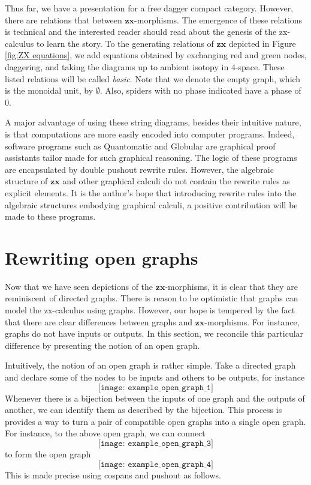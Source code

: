 \documentclass[11pt]{amsart}
\newcommand{\cat}[1]{\mathbf{#1}}
\theoremstyle{remark}
\theoremstyle{definition}
\begin{document}
Thus far, we have a presentation for a free dagger compact category. However, there are relations that between $\cat{zx}$-morphisms.  The emergence of these relations is technical and the interested reader should read about the genesis of the zx-calculus \cite{CoeckeDuncan_QuantumObsFullPaper} to learn the story. To the generating relations of $\cat{zx}$ depicted in Figure \ref{fig:ZX equations}, we add equations obtained by exchanging red and green nodes, daggering, and taking the diagrams up to ambient isotopy in $4$-space. These listed relations will be called \emph{basic}. Note that we denote the empty graph, which is the monoidal unit, by $\emptyset$. Also, spiders with no phase indicated have a phase of $0$. 

A major advantage of using these string diagrams, besides their intuitive nature, is that computations are more easily encoded into computer programs.  Indeed, software programs such as Quantomatic \cite{BarKissingerVicary_Globular,DixonDuncanKissinger_QuantomaticWebsite} and Globular \cite{BarKissingerVicary_Globular} are graphical proof assistants tailor made for such graphical reasoning.  The logic of these programs are encapsulated by double pushout rewrite rules.  However, the algebraic structure of $\cat{zx}$ and other graphical calculi do not contain the rewrite rules as explicit elements.  It is the author's hope that introducing rewrite rules into the algebraic structures embodying graphical calculi, a positive contribution will be made to these programs.  

\section{Rewriting open graphs}
\label{sec:RewritingOpenGraphs}

Now that we have seen depictions of the $\cat{zx}$-morphisms, it is clear that they are reminiscent of directed graphs.  There is reason to be optimistic that graphs can model the zx-calculus using graphs.  However, our hope is tempered by the fact that there are clear differences between graphs and $\cat{zx}$-morphisms.  For instance, graphs do not have inputs or outputs. In this section, we reconcile this particular difference by presenting the notion of an open graph.

Intuitively, the notion of an open graph is rather simple.  Take a directed graph and declare some of the nodes to be inputs and others to be outputs, for instance
\[
\texttt{[image: example\_open\_graph\_1]}
\]
Whenever there is a bijection between the inputs of one graph and the outputs of another, we can identify them as described by the bijection.  This process is provides a way to turn a pair of compatible open graphs into a single open graph.  For instance, to the above open graph, we can connect 
\[
	\texttt{[image: example\_open\_graph\_3]}
\]
to form the open graph
\[
	\texttt{[image: example\_open\_graph\_4]}
\]
This is made precise using cospans and pushout as follows. 
\end{document}
